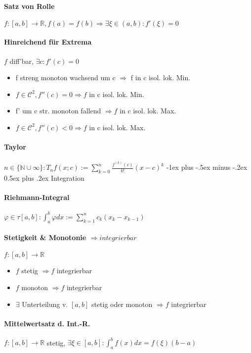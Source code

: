 \documentclass[paper=a4,paper=landscape, fontsize=6pt,DIV=25, twoside]{scrartcl}
\makeatletter
\newcommand{\real}{{\mathbb{R}}}
\newcommand{\nat}{\mathbb{N}}
\renewcommand{\section}{\@startsection{section}{1}{0mm}%
                                {-1ex plus -.5ex minus -.2ex}%
                                {0.5ex plus .2ex}%
                                {\normalfont\large\bfseries}}
\makeatother
\begin{document}
\begin{multicols*}{4}
			\paragraph{Satz von Rolle}
			$f: [a,b] \rightarrow \real, f(a)=f(b) \Rightarrow \exists \xi \in (a,b): f'(\xi)=0$
			\paragraph{Hinreichend für Extrema}
			$f$ diff'bar, $\exists c: f'(c)=0$
		\begin{itemize}
			\item f streng monoton wachsend um c $\Rightarrow$ f in c isol. lok. Min.
			\item $f \in \mathscr{C}^2, f''(c)=0 \Rightarrow f$ in c isol. lok. Min.
			\item f' um c str. monoton fallend $\Rightarrow f$ in c isol. lok. Max.
			\item $f \in \mathscr{C}^2, f''(c)<0 \Rightarrow f$ in c isol. lok. Max.
		\end{itemize}
	\paragraph{Taylor}
	$ n \in \{\nat \cup \infty\}: T_nf(x;c):= \sum_{k=0}^{n}\frac{f^{(k)}(c)}{k!}(x-c)^k$
	\section{Integration}
	\paragraph{Riehmann-Integral}
	$\varphi \in \tau [a,b]: \int_{a}^{b}\varphi dx := \sum_{k=1}^{n}c_k(x_k-x_{k-1})$
	\paragraph{Stetigkeit \& Monotonie $\Rightarrow integrierbar$} $f: [a,b] \rightarrow \real$
	\begin{itemize}
		\item $f$ stetig $\Rightarrow f$ integrierbar
		\item $f$ monoton $\Rightarrow f$ integrierbar
		\item $\exists$ Unterteilung v. $[a,b]$ stetig oder monoton $\Rightarrow f$ integrierbar 
	\end{itemize}
\paragraph{Mittelwertsatz d. Int.-R.}
$f:[a,b] \rightarrow \real$ stetig, $\exists \xi \in [a,b]: \int_{a}^{b}f(x)dx=f(\xi)(b-a)$

\end{multicols*}
\end{document}

